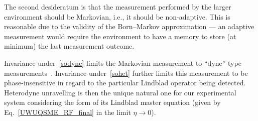 \documentclass[./Main-revtex.tex]{subfiles}
\begin{document}
The second desideratum is that the measurement performed by the larger environment should be Markovian, i.e., it should be non-adaptive. This is reasonable due to the validity of the Born--Markov approximation --- an adaptive measurement would require the environment to have a memory to store (at minimum) the last measurement outcome.

Invariance under~\eqref{sodyne} limits the Markovian measurement to ``dyne''-type measurements~\cite{wiseman2009quantum}. Invariance under~\eqref{sohet} further limits this measurement to be phase-insensitive in regard to the particular Lindblad operator being detected. Heterodyne unravelling is then the unique natural one for our experimental system considering the form of its Lindblad master equation (given by Eq.~\eqref{UWUQSME_RF_final} in the limit $\eta\to0$).

\ifSubfilesClassLoaded{%
    
}{%
}
\end{document}
